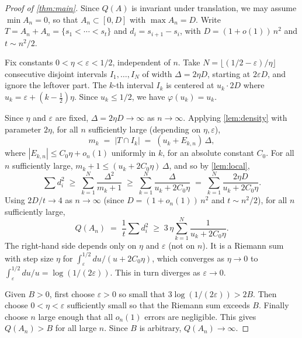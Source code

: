 \documentclass[11pt]{amsart}
\begin{document}
\begin{proof}[Proof of \cref{thm:main}]
Since $Q(A)$ is invariant under translation, we may assume $\min A_n = 0$, so that $A_n \subset [0, D]$ with $\max A_n = D$. Write $T = A_n + A_n = \{s_1 < \cdots < s_t\}$ and $d_i = s_{i+1} - s_i$, with $D = (1+o(1))\,n^2$ and $t \sim n^2/2$.

Fix constants $0 < \eta < \varepsilon < 1/2$, independent of $n$. Take $N = \lfloor (1/2 - \varepsilon)/\eta \rfloor$ consecutive disjoint intervals $I_1, \ldots, I_N$ of width $\Delta = 2\eta D$, starting at $2\varepsilon D$, and ignore the leftover part. The $k$-th interval $I_k$ is centered at $u_k \cdot 2D$ where $u_k = \varepsilon + (k - \tfrac{1}{2})\eta$. Since $u_k \leq 1/2$, we have $\varphi(u_k) = u_k$.

Since $\eta$ and $\varepsilon$ are fixed, $\Delta = 2\eta D \to \infty$ as $n \to \infty$. Applying \cref{lem:density} with parameter $2\eta$, for all $n$ sufficiently large (depending on $\eta, \varepsilon$),
\[
m_k \;=\; |T \cap I_k| \;=\; (u_k + E_{k,n})\,\Delta,
\]
where $|E_{k,n}| \leq C_0 \eta + o_n(1)$ uniformly in $k$, for an absolute constant $C_0$. For all $n$ sufficiently large, $m_k + 1 \leq (u_k + 2C_0\eta)\,\Delta$, and so by \cref{lem:local},
\[
\sum d_i^2 \;\geq\; \sum_{k=1}^{N} \frac{\Delta^2}{m_k + 1} \;\geq\; \sum_{k=1}^{N} \frac{\Delta}{u_k + 2C_0\eta} \;=\; \sum_{k=1}^{N} \frac{2\eta D}{u_k + 2C_0\eta}.
\]
Using $2D/t \to 4$ as $n \to \infty$ (since $D = (1+o_n(1))\,n^2$ and $t \sim n^2/2$), for all $n$ sufficiently large,
\[
Q(A_n) \;=\; \frac{1}{t}\sum d_i^2 \;\geq\; 3\,\eta \sum_{k=1}^{N} \frac{1}{u_k + 2C_0\eta}.
\]
The right-hand side depends only on $\eta$ and $\varepsilon$ (not on $n$). It is a Riemann sum with step size $\eta$ for $\int_\varepsilon^{1/2} du/(u + 2C_0\eta)$, which converges as $\eta \to 0$ to $\int_\varepsilon^{1/2} du/u = \log(1/(2\varepsilon))$. This in turn diverges as $\varepsilon \to 0$.

Given $B > 0$, first choose $\varepsilon > 0$ so small that $3\log(1/(2\varepsilon)) > 2B$. Then choose $0 < \eta < \varepsilon$ sufficiently small so that the Riemann sum exceeds $B$. Finally choose $n$ large enough that all $o_n(1)$ errors are negligible. This gives $Q(A_n) > B$ for all large $n$. Since $B$ is arbitrary, $Q(A_n) \to \infty$.
\end{proof}
\end{document}
